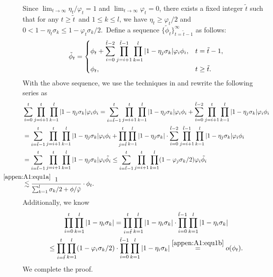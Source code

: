 Since $\lim_{t \rightarrow \infty}\eta_t/\varphi_t = 1$ and $\lim_{t \rightarrow \infty}\varphi_t = 0$, there exists a fixed integer $\tilde{t}$ such that for any $t\geq \tilde{t}$~and $1\leq k\leq l$, we have $\eta_t \geq \varphi_t/2$ and $0<1-\eta_t\sigma_k\leq 1-\varphi_t\sigma_k/2$.~Define a sequence $\{\tilde{\phi}_t\}_{t=\tilde{t}-1}^{\infty}$ as follows:
\begin{equation*}
\tilde{\phi}_t = \begin{dcases}
\phi_{t} + \sum_{i=0}^{\tilde{t}-2}\prod_{j=i+1}^{\tilde{t}-1}\prod_{k=1}^l |1-\eta_j\sigma_k|\varphi_i \phi_i, &t = \tilde{t}-1,\\
\phi_t, &t\geq \tilde{t}.
\end{dcases}
\end{equation*}
With the above sequence, we use the techniques in \citep[(E.19)]{Na2022Statistical} and rewrite the following series as
\begin{align*}
&\sum_{i=0}^t \prod_{j=i+1}^t \prod_{k=1}^l |1-\eta_j \sigma_k| \varphi_i \phi_i
= \sum_{i = \tilde{t}-1}^t \prod_{j=i+1}^t \prod_{k=1}^l |1-\eta_j \sigma_k| \varphi_i \phi_i + \sum_{i = 0}^{\tilde{t}-2} \prod_{j=i+1}^t \prod_{k=1}^l |1-\eta_j \sigma_k| \varphi_i \phi_i\\
&=\sum_{i = \tilde{t}-1}^t \prod_{j=i+1}^t \prod_{k=1}^l |1-\eta_j \sigma_k| \varphi_i \phi_i + \prod_{j=\tilde{t}}^t \prod_{k=1}^l |1-\eta_j \sigma_k|\cdot \sum_{i = 0}^{\tilde{t}-2} \prod_{j=i+1}^{\tilde{t}-1} \prod_{k=1}^l |1-\eta_j \sigma_k| \varphi_i \phi_i\\
& = \sum_{i = \tilde{t}-1}^t \prod_{j=i+1}^t \prod_{k=1}^l |1-\eta_j \sigma_k| \varphi_i \tilde{\phi_i} \leq \sum_{i = \tilde{t}-1}^t \prod_{j=i+1}^t \prod_{k=1}^l (1-\varphi_j\sigma_k/2) \varphi_i \tilde{\phi_i}\\ 
&\stackrel{\mathclap{\eqref{appen:A1:equ1a}}}{\lesssim} \frac{1}{\sum_{k=1}^l\sigma_k/2 + \phi/\tilde{\varphi}}\cdot \phi_t.
\end{align*}
Additionally, we know
\begin{multline*}
\prod_{i=0}^t \prod_{k=1}^l |1-\eta_i\sigma_k| = \prod_{i=\tilde{t}}^t \prod_{k=1}^l |1-\eta_i\sigma_k| \cdot \prod_{i = 0}^{\tilde{t}-1}\prod_{k=1}^l |1-\eta_i\sigma_k|\\
\leq \prod_{i=\tilde{t}}^t \prod_{k=1}^l (1-\varphi_i\sigma_k/2) \cdot \prod_{i = 0}^{\tilde{t}-1}\prod_{k=1}^l |1-\eta_i\sigma_k| \stackrel{\eqref{appen:A1:equ1b}}{=} o(\phi_t).
\end{multline*}
We complete the proof.


